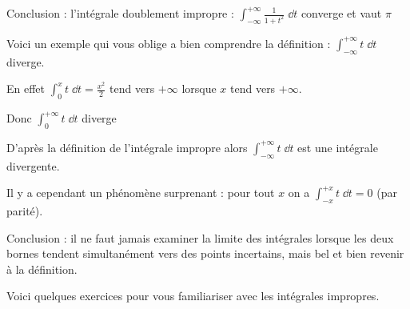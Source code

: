 \change
Conclusion : l'intégrale doublement impropre :
$\int_{-\infty}^{+\infty} \frac{1}{1+t^2}\;\dd t$ converge et vaut $\pi$

\change

Voici un exemple qui vous oblige a bien comprendre la définition :
$\int_{-\infty}^{+\infty}t\;\dd t$ diverge. 

\change
En effet  $\int_{0}^{x} t\;\dd t = \frac{x^2}{2}$ 
tend vers $+\infty$ lorsque $x$ tend vers  $+\infty$. 

\change
Donc $\int_0^{+\infty}t\;\dd t$ diverge

\change
D'après la définition de l'intégrale impropre alors
$\int_{-\infty}^{+\infty}t\;\dd t$ est une intégrale divergente.

\change
Il y a cependant un phénomène surprenant : 
pour tout $x$ on a $\int_{-x}^{+x} t\;\dd t=0$ (par parité). 

Conclusion : il ne faut jamais examiner la limite des intégrales lorsque 
les deux bornes tendent simultanément vers des points incertains, mais bel et bien revenir à la définition.



\diapo

Voici quelques exercices pour vous familiariser avec 
les intégrales impropres.


